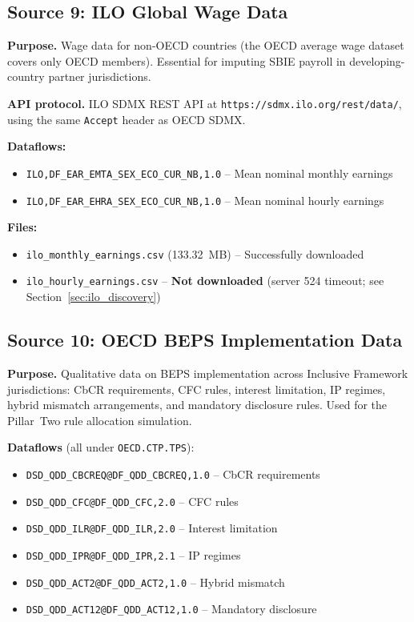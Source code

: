 \documentclass[12pt,a4paper]{article}
\begin{document}
\subsection{Source 9: ILO Global Wage Data}\label{sec:src_ilo}

\textbf{Purpose.}
Wage data for non-OECD countries (the OECD average wage dataset covers only OECD members).
Essential for imputing SBIE payroll in developing-country partner jurisdictions.

\textbf{API protocol.}
ILO SDMX REST API at \texttt{https://sdmx.ilo.org/rest/data/}, using the same \texttt{Accept} header as OECD SDMX.

\textbf{Dataflows:}
\begin{itemize}[nosep]
    \item \texttt{ILO,DF\_EAR\_EMTA\_SEX\_ECO\_CUR\_NB,1.0} -- Mean nominal monthly earnings
    \item \texttt{ILO,DF\_EAR\_EHRA\_SEX\_ECO\_CUR\_NB,1.0} -- Mean nominal hourly earnings
\end{itemize}

\textbf{Files:}
\begin{itemize}[nosep]
    \item \texttt{ilo\_monthly\_earnings.csv} (133.32~MB) -- Successfully downloaded
    \item \texttt{ilo\_hourly\_earnings.csv} -- \textbf{Not downloaded} (server 524 timeout; see Section~\ref{sec:ilo_discovery})
\end{itemize}


\subsection{Source 10: OECD BEPS Implementation Data}\label{sec:src_beps}

\textbf{Purpose.}
Qualitative data on BEPS implementation across Inclusive Framework jurisdictions: CbCR requirements, CFC rules, interest limitation, IP regimes, hybrid mismatch arrangements, and mandatory disclosure rules.
Used for the Pillar~Two rule allocation simulation.

\textbf{Dataflows} (all under \texttt{OECD.CTP.TPS}):
\begin{itemize}[nosep]
    \item \texttt{DSD\_QDD\_CBCREQ@DF\_QDD\_CBCREQ,1.0} -- CbCR requirements
    \item \texttt{DSD\_QDD\_CFC@DF\_QDD\_CFC,2.0} -- CFC rules
    \item \texttt{DSD\_QDD\_ILR@DF\_QDD\_ILR,2.0} -- Interest limitation
    \item \texttt{DSD\_QDD\_IPR@DF\_QDD\_IPR,2.1} -- IP regimes
    \item \texttt{DSD\_QDD\_ACT2@DF\_QDD\_ACT2,1.0} -- Hybrid mismatch
    \item \texttt{DSD\_QDD\_ACT12@DF\_QDD\_ACT12,1.0} -- Mandatory disclosure
\end{itemize}
\end{document}
